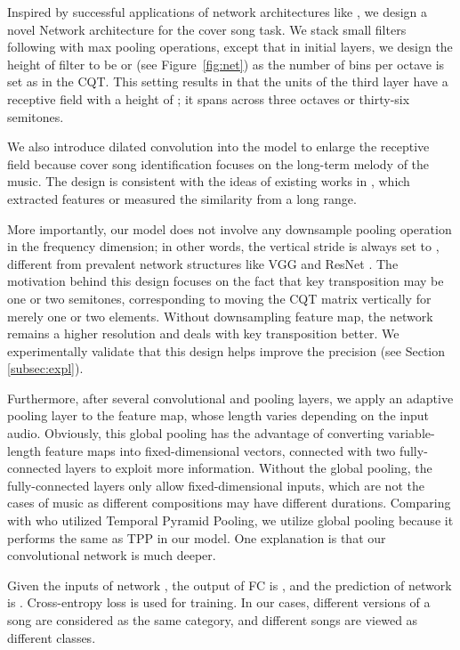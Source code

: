 \documentclass{article}
\newcommand{\figref}[1]{\mbox{Figure~\ref{#1}}}
\begin{document}
Inspired by successful applications of network architectures like \cite{simonyan2014very,he2016deep}, we design a novel Network architecture for the cover song task. We stack small filters following with max pooling operations, except that in initial layers, we design the height of filter to be  or  (see \figref{fig:net}) as the number of bins per octave is set as  in the CQT.
This setting results in that the units of the third layer have a receptive field with a height of ; it spans across three octaves or thirty-six semitones. 

We also introduce dilated convolution into the model to enlarge the receptive field because cover song identification focuses on the long-term melody of the music. The design is consistent with the ideas of existing works in \cite{serra2008chroma,bertin2012large}, which extracted features or measured the similarity from a long range. 


More importantly, our model does not involve any downsample pooling operation in the frequency dimension; in other words, the vertical stride is always set to , different from prevalent network structures like VGG and ResNet \cite{simonyan2014very,he2016deep}. The motivation behind this design focuses on the fact that key transposition may be one or two semitones, corresponding to moving the CQT matrix vertically for merely one or two elements. Without downsampling feature map, the network remains a higher resolution and deals with key transposition better. We experimentally validate that this design helps improve the precision (see Section \ref{subsec:expl}). 

Furthermore, after several convolutional and pooling layers, we apply an adaptive pooling layer to the feature map, whose length varies depending on the input audio. Obviously, this global pooling has the advantage of converting variable-length feature maps into fixed-dimensional vectors, connected with two fully-connected layers to exploit more information. Without the global pooling, the fully-connected layers only allow fixed-dimensional inputs, which are not the cases of music as different compositions may have different durations. Comparing with \cite{yu2019temporal} who utilized Temporal Pyramid Pooling, we utilize global pooling because it performs the same as TPP in our model. One explanation is that our convolutional network is much deeper.


Given the inputs of network , the output of FC is  , and the prediction of network is . Cross-entropy loss  is used for training. In our cases, different versions of a song are considered as the same category, and different songs are viewed as different classes.
\end{document}
